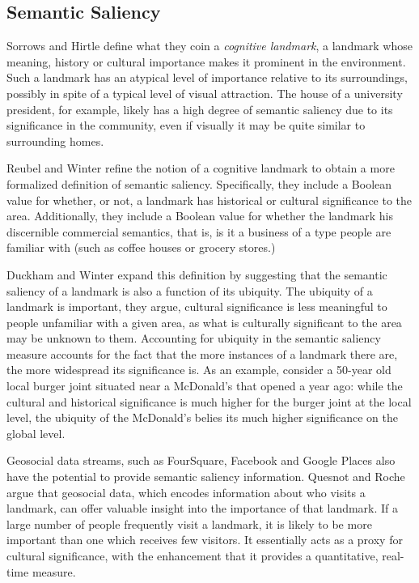 \subsection{Semantic Saliency}

Sorrows and Hirtle \cite{sorrows1999nature} define what they coin a \textit{cognitive landmark}, a landmark whose meaning, history or cultural importance makes it prominent in the environment. Such a landmark has an atypical level of importance relative to its surroundings, possibly in spite of a typical level of visual attraction. The house of a university president, for example, likely has a high degree of semantic saliency due to its significance in the community, even if visually it may be quite similar to surrounding homes.

Reubel and Winter \cite{sorrows1999nature} refine the notion of a cognitive landmark to obtain a more formalized definition of semantic saliency. Specifically, they include a Boolean value for whether, or not, a landmark has historical or cultural significance to the area. Additionally, they include a Boolean value for whether the landmark his discernible commercial semantics, that is, is it a business of a type people are familiar with (such as coffee houses or grocery stores.)

Duckham and Winter \cite{quesnot2012linked} expand this definition by suggesting that the semantic saliency of a landmark is also a function of its ubiquity. The ubiquity of a landmark is important, they argue, cultural significance is less meaningful to people unfamiliar with a given area, as what is culturally significant to the area may be unknown to them. Accounting for ubiquity in the semantic saliency measure accounts for the fact that the more instances of a landmark there are, the more widespread its significance is. As an example, consider a 50-year old local burger joint situated near a McDonald's that opened a year ago: while the cultural and historical significance is much higher for the burger joint at the local level, the ubiquity of the McDonald's belies its much higher significance on the global level.

Geosocial data streams, such as FourSquare, Facebook and Google Places also have the potential to provide semantic saliency information. Quesnot and Roche \cite{quesnot2014measure} argue that geosocial data, which encodes information about who visits a landmark, can offer valuable insight into the importance of that landmark. If a large number of people frequently visit a landmark, it is likely to be more important than one which receives few visitors. It essentially acts as a proxy for cultural significance, with the enhancement that it provides a quantitative, real-time measure. 

